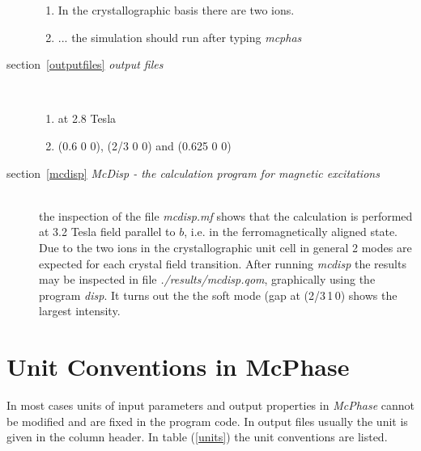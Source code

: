 \documentclass[twoside]{article}
\newcommand{\prg}{\sl}
\begin{document}
\begin{description}
 \begin{enumerate}
 \item In the crystallographic basis there are two ions.
 \item ... the simulation should run after typing {\prg mcphas}
 \end{enumerate}
\item[section~\ref{outputfiles} {\em output files}] \ 
 \begin{enumerate}
 \item at 2.8 Tesla
 \item (0.6 0 0), (2/3 0 0) and (0.625 0 0)
 \end{enumerate}
\item[section~\ref{mcdisp} {\em {\prg McDisp} - the calculation program for magnetic excitations}] \ \\
 the inspection of the file {\prg mcdisp.mf\index{mcdisp.mf}} shows that the calculation is performed at 3.2 Tesla field
 parallel to $b$, i.e. in the ferromagnetically aligned state. Due to the two ions in the crystallographic
 unit cell in general 2 modes are expected for each crystal field transition. After running {\prg mcdisp}
 the results may be inspected in file {\prg ./results/mcdisp.qom}, graphically using the program {\prg disp}.
 It turns out the the soft mode (gap at (2/3\,1\,0) shows the largest intensity.
\end{description}


\clearpage
\section{Unit Conventions in McPhase}

In most cases units of input parameters and output properties in {\prg McPhase} cannot be modified and 
are fixed in the program code. In output files usually the unit is given in the column header.
In table (\ref{units}) the unit conventions are listed.
\end{document}
